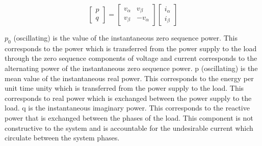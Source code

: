 \documentclass[journal,twoside]{IEEEtran}
\begin{document}

\[\begin{bmatrix} p\\q \end{bmatrix} =  \begin{bmatrix} v_{\alpha} & v_{\beta}\\v_{\beta} & -v_{\alpha} \end{bmatrix} \begin{bmatrix} i_{\alpha} \\i_{\beta} \end{bmatrix}
\]


$p_0$ (oscillating) is the value of the instantaneous zero
sequence power. This corresponds to the power which is
transferred from the power supply to the load through the zero
sequence components of voltage and current corresponds to the
alternating power of the instantaneous zero sequence power.
p (oscillating) is the mean value of the instantaneous real
power. This corresponds to the energy per unit time unity
which is transferred from the power supply to the load. This
corresponds to real power which is exchanged between the
power supply to the load. q is the instantaneous imaginary
power. This corresponds to the reactive power that is
exchanged between the phases of the load. This component is
not constructive to the system and is accountable for the
undesirable current which circulate between the system phases.
\end{document}
